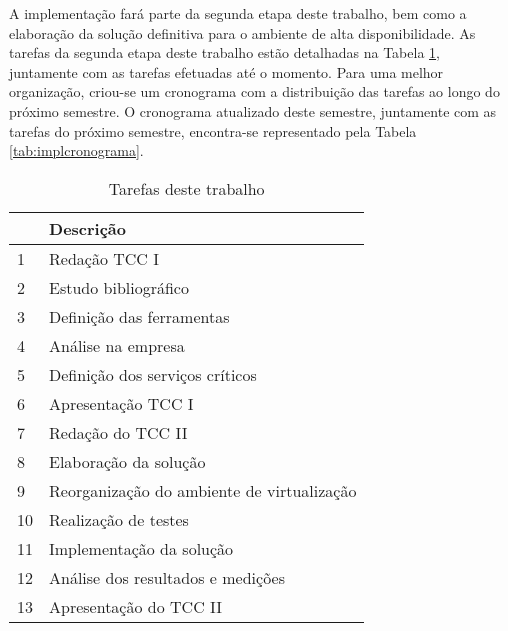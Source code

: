 A implementação fará parte da segunda etapa deste trabalho, bem como a elaboração da solução definitiva para o ambiente de alta disponibilidade. 
As tarefas da segunda etapa deste trabalho estão detalhadas na Tabela \ref{tab:impltarefas}, juntamente com as tarefas efetuadas até o momento. 
Para uma melhor organização, criou-se um cronograma com a distribuição das tarefas ao longo do próximo semestre. O cronograma atualizado 
deste semestre, juntamente com as tarefas do próximo semestre, encontra-se representado pela Tabela \ref{tab:implcronograma}.

\begin{table}[h!]\normalsize
\caption {Tarefas deste trabalho}
\label{tab:impltarefas}
\begin{center}
\begin{tabular}{|l|l|}\hline
 & Descrição \\\hline
1 & Redação TCC I \\\hline
2 & Estudo bibliográfico \\\hline
3 & Definição das ferramentas \\\hline
4 & Análise na empresa \\\hline
5 & Definição dos serviços críticos \\\hline
6 & Apresentação TCC I \\\hline
7 & Redação do TCC II \\\hline
8 & Elaboração da solução \\\hline
9 & Reorganização do ambiente de virtualização \\\hline
10 & Realização de testes \\\hline
11 & Implementação da solução \\\hline
12 & Análise dos resultados e medições \\\hline
13 & Apresentação do TCC II \\\hline
\end{tabular}
\end{center}
\end{table}

